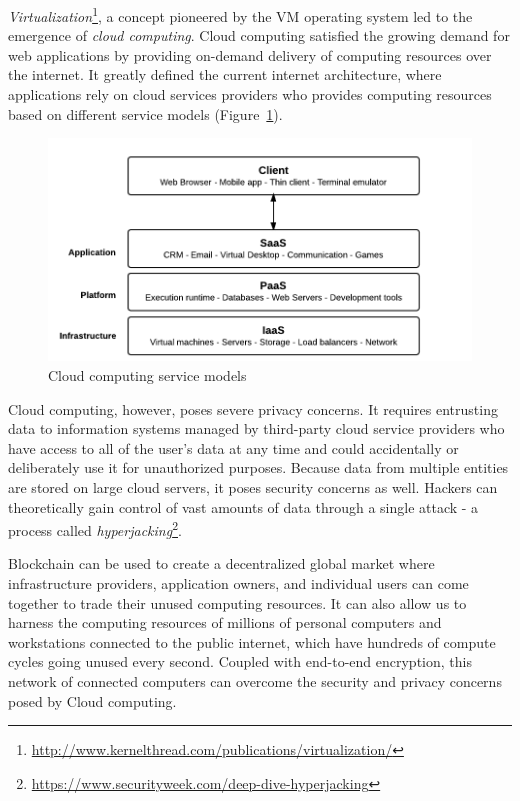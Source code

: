 	\textit{Virtualization}\footnote{\url{http://www.kernelthread.com/publications/virtualization/}}, a concept pioneered by the VM\cite{creasy1981origin} operating system led to the emergence of \textit{cloud computing}. Cloud computing satisfied the growing demand for web applications by providing on-demand delivery of computing resources over the internet. It greatly defined the current internet architecture, where applications rely on cloud services providers who provides computing resources based on different service models (Figure~\ref{fig:service-models}).
	
	\begin{figure}[h]
		\includegraphics[width=\linewidth]{figures/service-models}
		\caption{\label{fig:service-models} Cloud computing service models\protect\footnotemark}
	\end{figure}
	
	Cloud computing, however, poses severe privacy concerns. It requires entrusting data to information systems managed by third-party cloud service providers who have access to all of the user's data at any time and could accidentally or deliberately use it for unauthorized purposes\cite{ryan2011cloud}. Because data from multiple entities are stored on large cloud servers, it poses security concerns as well. Hackers can theoretically gain control of vast amounts of data through a single attack - a process called \textit{hyperjacking}\footnote{\url{https://www.securityweek.com/deep-dive-hyperjacking}}.
	
	Blockchain can be used to create a decentralized global market where infrastructure providers,  application owners, and individual users can come together to trade their unused computing resources. It can also allow us to harness the computing resources of millions of personal computers and workstations connected to the public internet, which have hundreds of compute cycles going unused every second\cite{crowcroft2003peer}. Coupled with end-to-end encryption, this network of connected computers can overcome the security and privacy concerns posed by Cloud computing.
	
